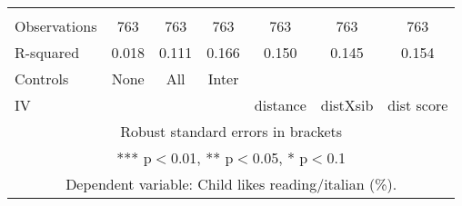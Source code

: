 \begin{tabular}{lcccccc}
 &  &  &  &  &  &  \\
Observations & 763 & 763 & 763 & 763 & 763 & 763 \\
R-squared & 0.018 & 0.111 & 0.166 & 0.150 & 0.145 & 0.154 \\
Controls & None & All & Inter &  &  &  \\
 IV &  &  &  & distance & distXsib & dist score \\ \hline
\multicolumn{7}{c}{ Robust standard errors in brackets} \\
\multicolumn{7}{c}{ *** p$<$0.01, ** p$<$0.05, * p$<$0.1} \\
\multicolumn{7}{c}{ Dependent variable: Child likes reading/italian (\%).} \\
\end{tabular}
